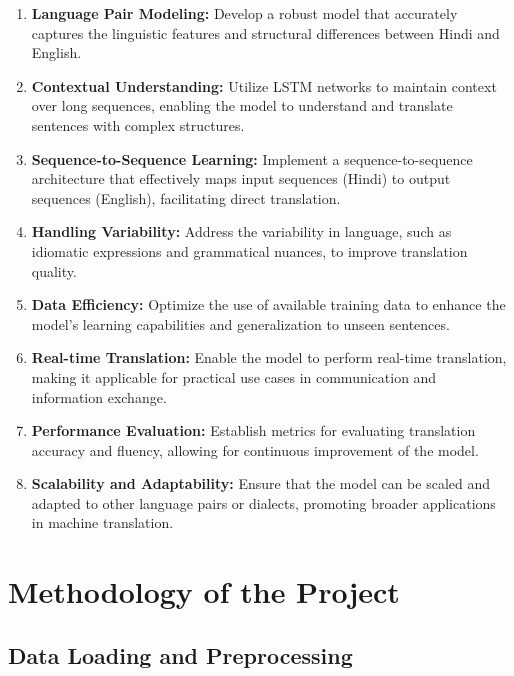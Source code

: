\documentclass{article}
\begin{document}
\begin{enumerate}
    \item \textbf{Language Pair Modeling:} Develop a robust model that accurately captures the linguistic features and structural differences between Hindi and English.

    \item \textbf{Contextual Understanding:} Utilize LSTM networks to maintain context over long sequences, enabling the model to understand and translate sentences with complex structures.

    \item \textbf{Sequence-to-Sequence Learning:} Implement a sequence-to-sequence architecture that effectively maps input sequences (Hindi) to output sequences (English), facilitating direct translation.

    \item \textbf{Handling Variability:} Address the variability in language, such as idiomatic expressions and grammatical nuances, to improve translation quality.

    \item \textbf{Data Efficiency:} Optimize the use of available training data to enhance the model's learning capabilities and generalization to unseen sentences.

    \item \textbf{Real-time Translation:} Enable the model to perform real-time translation, making it applicable for practical use cases in communication and information exchange.

    \item \textbf{Performance Evaluation:} Establish metrics for evaluating translation accuracy and fluency, allowing for continuous improvement of the model.

    \item \textbf{Scalability and Adaptability:} Ensure that the model can be scaled and adapted to other language pairs or dialects, promoting broader applications in machine translation.
\end{enumerate}

\section{Methodology of the Project}

\subsection*{Data Loading and Preprocessing}
\end{document}
